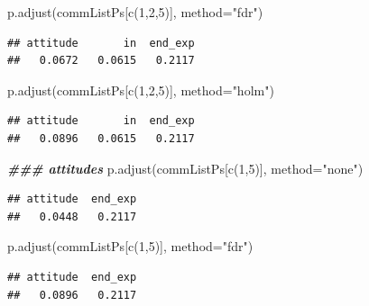 \documentclass[
]{article}
\newenvironment{Shaded}{\begin{snugshade}}{\end{snugshade}}
\newcommand{\AttributeTok}[1]{\textcolor[rgb]{0.77,0.63,0.00}{#1}}
\newcommand{\DecValTok}[1]{\textcolor[rgb]{0.00,0.00,0.81}{#1}}
\newcommand{\DocumentationTok}[1]{\textcolor[rgb]{0.56,0.35,0.01}{\textbf{\textit{#1}}}}
\newcommand{\FunctionTok}[1]{\textcolor[rgb]{0.00,0.00,0.00}{#1}}
\newcommand{\NormalTok}[1]{#1}
\newcommand{\StringTok}[1]{\textcolor[rgb]{0.31,0.60,0.02}{#1}}
\begin{document}
\begin{Shaded}
\begin{Highlighting}[]
\FunctionTok{p.adjust}\NormalTok{(commListPs[}\FunctionTok{c}\NormalTok{(}\DecValTok{1}\NormalTok{,}\DecValTok{2}\NormalTok{,}\DecValTok{5}\NormalTok{)], }\AttributeTok{method=}\StringTok{"fdr"}\NormalTok{)}
\end{Highlighting}
\end{Shaded}

\begin{verbatim}
## attitude       in  end_exp 
##   0.0672   0.0615   0.2117
\end{verbatim}

\begin{Shaded}
\begin{Highlighting}[]
\FunctionTok{p.adjust}\NormalTok{(commListPs[}\FunctionTok{c}\NormalTok{(}\DecValTok{1}\NormalTok{,}\DecValTok{2}\NormalTok{,}\DecValTok{5}\NormalTok{)], }\AttributeTok{method=}\StringTok{"holm"}\NormalTok{)}
\end{Highlighting}
\end{Shaded}

\begin{verbatim}
## attitude       in  end_exp 
##   0.0896   0.0615   0.2117
\end{verbatim}

\begin{Shaded}
\begin{Highlighting}[]
\DocumentationTok{\#\#\# attitudes}
\FunctionTok{p.adjust}\NormalTok{(commListPs[}\FunctionTok{c}\NormalTok{(}\DecValTok{1}\NormalTok{,}\DecValTok{5}\NormalTok{)], }\AttributeTok{method=}\StringTok{"none"}\NormalTok{)}
\end{Highlighting}
\end{Shaded}

\begin{verbatim}
## attitude  end_exp 
##   0.0448   0.2117
\end{verbatim}

\begin{Shaded}
\begin{Highlighting}[]
\FunctionTok{p.adjust}\NormalTok{(commListPs[}\FunctionTok{c}\NormalTok{(}\DecValTok{1}\NormalTok{,}\DecValTok{5}\NormalTok{)], }\AttributeTok{method=}\StringTok{"fdr"}\NormalTok{)}
\end{Highlighting}
\end{Shaded}

\begin{verbatim}
## attitude  end_exp 
##   0.0896   0.2117
\end{verbatim}
\end{document}
